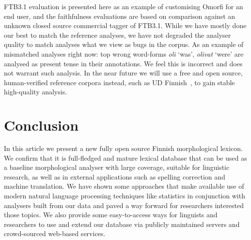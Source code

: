 \documentclass[preprint]{flammie}
\newif\iffinal
\begin{document}
FTB3.1 evaluation is presented here as an example of customising Omorfi for an
end user, and the faithfulness evaluations are based on comparison against an
unknown closed source commercial tagger of FTB3.1. While we have mostly done
our best to match the reference analyses, we have not degraded the analyser
quality to match analyses what we view as bugs in the corpus. As an example of
mismatched analyses right now: top wrong word-forms \textit{oli} `was',
\textit{olivat} `were' are analysed as present tense in their annotations. We
feel this is incorrect and does not warrant such analysis. In the near future
we will use a free and open source, human-verified reference corpora instead,
such as UD Finnish~\citep{pyysalo2015universal}, to gain stable high-quality
analysis.


\section{Conclusion}
\label{sec:conclusion}

In this article we present a new fully open source Finnish
morphological lexicon. We confirm that it is full-fledged and mature lexical
database that can be used as a baseline morphological analyser with large
coverage, suitable for linguistic research, as well as in external applications
such as spelling correction and machine translation. We have shown
some approaches that make available use of modern natural language processing
techniques like statistics in conjunction with analysers built from our data
and paved a way forward for researchers interested those topics. We also
provide some easy-to-access ways for linguists and researchers to use and
extend our database via publicly maintained servers and crowd-sourced web-based
services.



\iffinal
\newpage
\begin{small}
    \noindent Contact Information:\\
\\
    Tommi A Pirinen\\
    Ollscoil Chathair Bhaile Átha Cliath\\
    IE-D09 W6Y4\\
    Éire\\
    e-mail: \url{Tommi.Pirinen@computing.dcu.ie}\\
\end{small}
\fi
\end{document}
